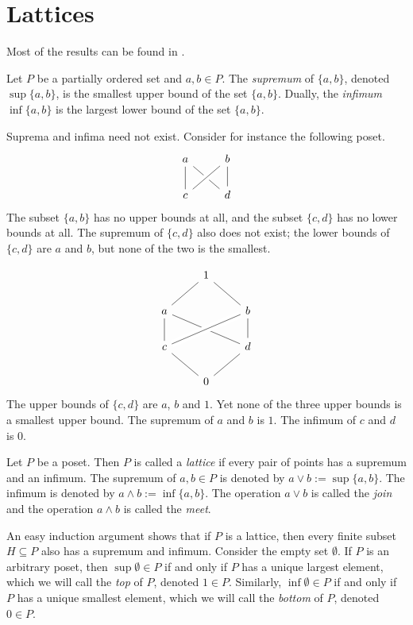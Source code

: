 %
%

\chapter{Lattices}

Most of the results can be found in \cite{gratzer78}.

\begin{definition}
Let $P$ be a partially ordered set and $a,b \in P$. The \emph{supremum} of $\{a,b\}$, denoted $\sup\{a,b\}$, is the smallest upper bound of the set $\{a,b\}$. Dually, the \emph{infimum} $\inf \{a,b\}$ is the largest lower bound of the set $\{a,b\}$.
\end{definition}
\begin{example}
Suprema and infima need not exist. Consider for instance the following poset.
\[ \begin{tikzcd}
a \arrow[d, no head] \arrow[dr, no head] & b \arrow[dl, no head, crossing over] \arrow[d, no head] \\
c & d
\end{tikzcd} \]
The subset $\{a,b\}$ has no upper bounds at all, and the subset $\{c,d\}$ has no lower bounds at all. The supremum of $\{c,d\}$ also does not exist; the lower bounds of $\{c,d\}$ are $a$ and $b$, but none of the two is the smallest.
\end{example}
\begin{example}
\[ \begin{tikzcd}
  & 1 \arrow[dr, no head] \arrow[dl, no head] &   \\
a \arrow[d, no head] \arrow[drr, no head] &   & b \arrow[dll, no head, crossing over] \arrow[d, no head] \\
c \arrow[dr, no head] &   & d \arrow[dl, no head] \\
  & 0 &
\end{tikzcd} \]
The upper bounds of $\{c,d\}$ are $a$, $b$ and $1$. Yet none of the three upper bounds is a smallest upper bound. The supremum of $a$ and $b$ is $1$. The infimum of $c$ and $d$ is $0$.
\end{example}
\begin{definition}
Let $P$ be a poset. Then $P$ is called a \emph{lattice} if every pair of points has a supremum and an infimum. The supremum of $a,b \in P$ is denoted by $a \vee b := \sup\{a,b\}$. The infimum is denoted by $a \wedge b := \inf\{a,b\}$. The operation $a \vee b$ is called the \emph{join} and the operation $a \wedge b$ is called the \emph{meet}.
\end{definition}
An easy induction argument shows that if $P$ is a lattice, then every finite subset $H \subseteq P$ also has a supremum and infimum.
Consider the empty set $\emptyset$. If $P$ is an arbitrary poset, then $\sup \emptyset \in P$ if and only if $P$ has a unique largest element, which we will call the \emph{top} of $P$, denoted $1 \in P$. Similarly, $\inf \emptyset \in P$ if and only if $P$ has a unique smallest element, which we will call the \emph{bottom} of $P$, denoted $0 \in P$.

